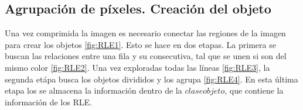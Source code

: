 \subsection{Agrupaci\'on de p\'ixeles. Creaci\'on del objeto}

Una vez comprimida la imagen es necesario conectar las regiones de la imagen para crear los objetos \ref{fig:RLE1}. Esto se hace en dos etapas. La primera se buscan las relaciones entre una fila y su consecutiva, tal que se unen si son del mismo color \ref{fig:RLE2}. Una vez exploradas todas las l\'ineas \ref{fig:RLE3}, la segunda etápa busca los objetos divididos y los agrupa \ref{fig:RLE4}. En esta \'ultima etapa los se almacena la información dentro de la $clase objeto$, que contiene la información de los RLE.

